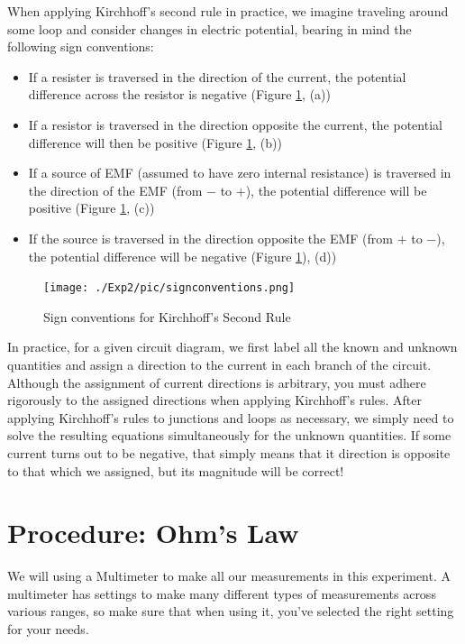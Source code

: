 When applying Kirchhoff's second rule in practice, we imagine traveling around some loop and consider changes in electric potential, bearing in mind the following sign conventions:\myskip
\begin{itemize}
	\item If a resister is traversed in the direction of the current, the potential difference across the resistor is negative (Figure \ref{fig:signconventions}, (a))
	\item If a resistor is traversed in the direction opposite the current, the potential difference will then be positive (Figure \ref{fig:signconventions}, (b))
	\item If a source of EMF (assumed to have zero internal resistance) is traversed in the direction of the EMF (from $-$ to $+$), the potential difference will be positive (Figure \ref{fig:signconventions}, (c))
	\item If the source is traversed in the direction opposite the EMF (from $+$ to $-$), the potential difference will be negative (Figure \ref{fig:signconventions}), (d))
\end{itemize}

\begin{figure}[h]
\centering
\texttt{[image: ./Exp2/pic/signconventions.png]}
\caption{Sign conventions for Kirchhoff's Second Rule}
\label{fig:signconventions}
\end{figure}

In practice, for a given circuit diagram, we first label all the known and unknown quantities and assign a direction to the current in each branch of the circuit. Although the assignment of current directions is arbitrary, you must adhere rigorously to the assigned directions when applying Kirchhoff's rules. After applying Kirchhoff's rules to junctions and loops as necessary, we simply need to solve the resulting equations simultaneously for the unknown quantities. If some current turns out to be negative, that simply means that it direction is opposite to that which we assigned, but its magnitude will be correct!

\section{Procedure: Ohm's Law}
\label{sec:ohmslaw}
We will using a Multimeter to make all our measurements in this experiment. A multimeter has settings to make many different types of measurements across various ranges, so make sure that when using it, you've selected the right setting for your needs.\myskip

